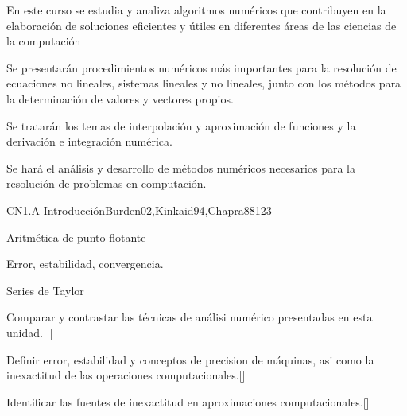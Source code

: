 \begin{syllabus}


\begin{justification}
En este curso se estudia y analiza algoritmos numéricos que
contribuyen en la elaboración de soluciones eficientes y útiles en
diferentes áreas de las ciencias de la computación
\end{justification}

\begin{goals}
\item Se presentarán procedimientos numéricos más importantes para la resolución de 
ecuaciones no lineales, sistemas lineales y no lineales, junto con los métodos 
para la determinación de valores y vectores propios.

\item Se tratarán los temas de interpolación y aproximación de funciones y la 
derivación e integración numérica.

\item Se hará el análisis y desarrollo de métodos numéricos necesarios para la 
resolución de problemas en computación.
\end{goals}

\begin{outcomes}
\item {}
\item {}
\item {}
\end{outcomes}

\begin{unit}{}{CN1.A Introducción}{Burden02,Kinkaid94,Chapra88}{12}{3}
  \begin{topics}
      \item Aritmética de punto flotante
      \item Error, estabilidad, convergencia.
      \item Series de Taylor
   \end{topics}

   \begin{learningoutcomes}
      \item Comparar y contrastar las técnicas de análisi numérico presentadas en esta unidad. [\Usage]
      \item Definir error, estabilidad y conceptos de precision de máquinas, asi como la inexactitud de las operaciones computacionales.[\Usage]
      \item Identificar las fuentes de inexactitud en aproximaciones computacionales.[\Usage]
   \end{learningoutcomes}
\end{unit}


\end{syllabus}
